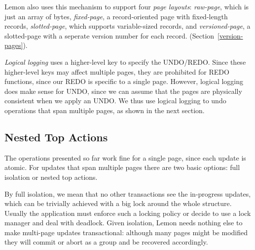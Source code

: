 \documentclass[10pt,letterpaper,twocolumn,english]{article}
\newcommand{\yad}{Lemon\xspace}
\begin{document}
\yad also uses this mechanism to support four {\em page layouts}: 
{\em raw-page}, which is just an array of
bytes, {\em fixed-page}, a record-oriented page with fixed-length records,
{\em slotted-page}, which supports variable-sized records, and 
{\em versioned-page},  a slotted-page with a seperate version number for 
each record. (Section~\ref{version-pages}).  

{\em Logical logging} uses a higher-level key to specify the
UNDO/REDO.  Since these higher-level keys may affect multiple pages,
they are prohibited for REDO functions, since our REDO is specific to
a single page.  However, logical logging does make sense for UNDO,
since we can assume that the pages are physically consistent when we
apply an UNDO.  We thus use logical logging to undo operations that
span multiple pages, as shown in the next section.




\subsection{Nested Top Actions}
\label{nested-top-actions}

The operations presented so far work fine for a single page, since
each update is atomic.  For updates that span multiple pages there 
are two basic options: full isolation or nested top actions.

By full isolation, we mean that no other transactions see the
in-progress updates, which can be trivially achieved with a big lock
around the whole structure.  Usually the application must enforce 
such a locking policy or decide to use a lock manager and deal with 
deadlock.  Given isolation, \yad needs nothing else to
make multi-page updates transactional: although many pages might be
modified they will commit or abort as a group and be recovered
accordingly.
\end{document}
